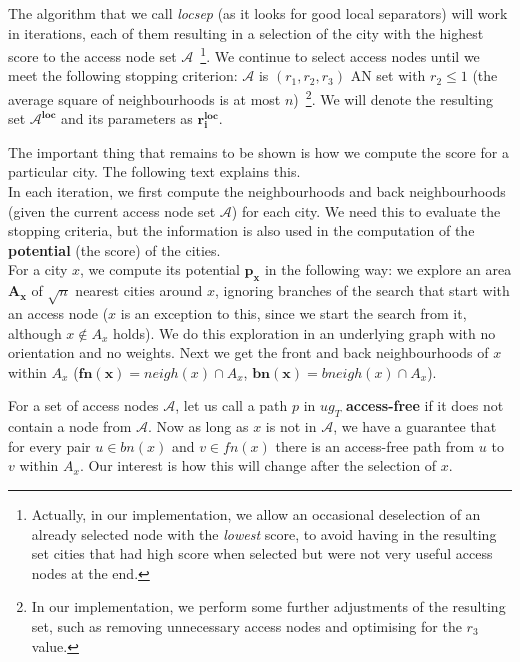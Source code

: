 		The algorithm that we call \textit{locsep} (as it looks for good local separators) will work in iterations, each of them resulting in a selection of the city with the highest score to the access node set $\mathcal{A}$~\footnote{Actually, in our implementation, we allow an occasional deselection of an already selected node with the \textit{lowest} score, to avoid having in the resulting set cities that had high score when selected but were not very useful access nodes at the end.}. We continue to select access nodes until we meet the following stopping criterion: $\mathcal{A}$ is $(r_{1}, r_{2}, r_{3})$ AN set with $r_{2} \leq 1$ (the average square of neighbourhoods is at most $n$)~\footnote{In our implementation, we perform some further adjustments of the resulting set, such as removing unnecessary access nodes and optimising for the $r_{3}$ value.}. We will denote the resulting set $\bm{\mathcal{A}^{loc}}$ and its parameters as $\bm{r_{i}^{loc}}$.
		
		The important thing that remains to be shown is how we compute the score for a particular city. The following text explains this. \\
		
		\noindent In each iteration, we first compute the neighbourhoods and back neighbourhoods (given the current access node set $\mathcal{A}$) for each city. We need this to evaluate the stopping criteria, but the information is also used in the computation of the \textbf{potential} (the score) of the cities. \\
		
		\noindent For a city $x$, we compute its potential $\bm{p_{x}}$ in the following way: we explore an area $\bm{A_{x}}$ of $\sqrt{n}$ nearest cities around $x$, ignoring branches of the search that start with an access node ($x$ is an exception to this, since we start the search from it, although $x \not \in A_{x}$ holds). We do this exploration in an underlying graph with no orientation and no weights. Next we get the front and back neighbourhoods of $x$ within $A_{x}$ ($\bm{fn(x)} = neigh(x) \cap A_{x}$, $\bm{bn(x)} = bneigh(x) \cap A_{x}$).
		
		For a set of access nodes $\mathcal{A}$, let us call a path $p$ in $ug_{T}$ \textbf{access-free} if it does not contain a node from $\mathcal{A}$. Now as long as $x$ is not in $\mathcal{A}$, we have a guarantee that for every pair $u \in bn(x)$ and $v \in fn(x)$ there is an access-free path from $u$ to $v$ within $A_{x}$. Our interest is how this will change after the selection of $x$.
				
